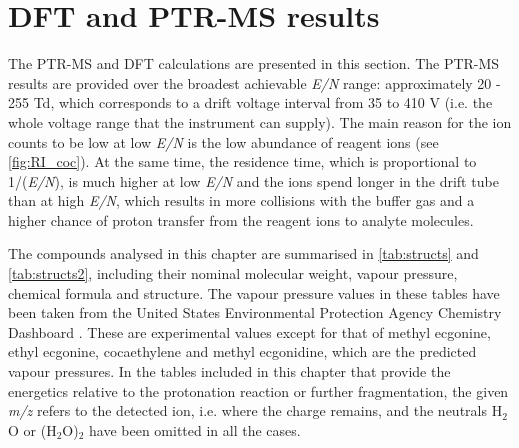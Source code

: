 \section{DFT and PTR-MS results}
The PTR-MS and DFT calculations are  presented in this section. The PTR-MS results are provided over the broadest achievable \textit{E/N} range: approximately 20 - 255 Td, which corresponds to a drift voltage interval from 35 to 410 V (i.e. the whole  voltage range that the instrument can supply). 
The main reason for the ion counts to be low at low \textit{E/N} is the low abundance of reagent ions (see \autoref{fig:RI_coc}). 
At the same time, the residence time, which is proportional to 1/(\textit{E/N}), is much higher at low \textit{E/N} and the ions spend longer in the drift tube than at high \textit{E/N}, which results in more collisions with the buffer gas and a higher chance of proton transfer from the reagent ions to analyte molecules. 
%
%



%
%
%
%

The compounds analysed in this chapter are summarised in \autoref{tab:structs} and \autoref{tab:structs2}, including their nominal molecular weight, vapour pressure, chemical formula and structure.
%
The vapour pressure values in these tables have been taken from the United States Environmental Protection Agency Chemistry Dashboard \cite{USAEPA}. These are experimental values except for that of methyl ecgonine, ethyl ecgonine, cocaethylene and methyl ecgonidine, which are the predicted vapour pressures.
%
 In the tables included in this chapter that provide the energetics relative to the protonation reaction or further fragmentation, the given \textit{m/z} refers to the detected ion, i.e. where the charge remains, and the neutrals H$_2$O or (H$_2$O)$_2$ have been omitted in all the cases.





